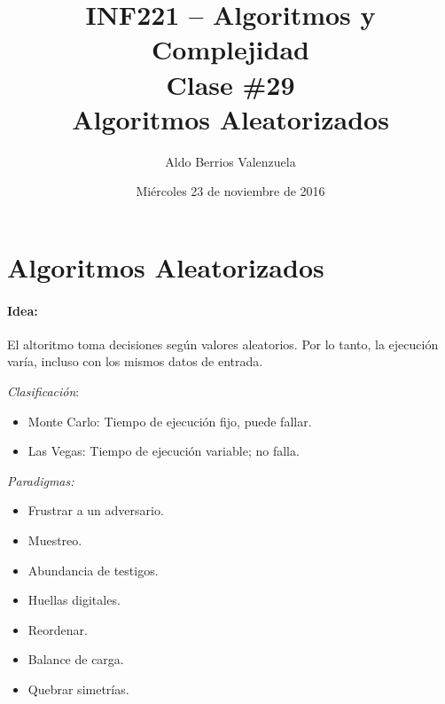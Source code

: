\documentclass[english, spanish, fleqn, 10pt]{article}
\author{Aldo Berrios Valenzuela}
\title{INF221 -- Algoritmos y Complejidad\\[.4\baselineskip]
Clase \#29\\
Algoritmos Aleatorizados}
\date{Miércoles 23 de noviembre de 2016}
\numberwithin{equation}{section}
\theoremstyle{definition}
\begin{document}
\maketitle

\section{Algoritmos Aleatorizados}
\paragraph{Idea:} El altoritmo toma decisiones según valores aleatorios. Por lo tanto, la ejecución varía, incluso con los mismos datos de entrada.

\emph{Clasificación}:
\begin{itemize}
	\item Monte Carlo: Tiempo de ejecución fijo, puede fallar.
	
	\item Las Vegas: Tiempo de ejecución variable; no falla.
\end{itemize}

\emph{Paradigmas:}
\begin{itemize}
	\item Frustrar a un adversario.
	\item Muestreo.
	\item Abundancia de testigos.
	\item Huellas digitales.
	\item Reordenar.
	\item Balance de carga.
	\item Quebrar simetrías.
\end{itemize}
\end{document}
